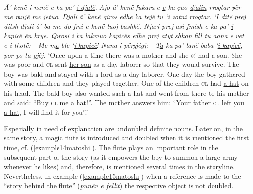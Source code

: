 \documentclass[output=paper]{langsci/langscibook}
\begin{document}
\ea \label{example13matoshi}
	\\
	\textit{Â’ kenë i nanë e ka pa’ \uline{i djalë}. Ajo â’ kenë fukara e \uline{e} ka çuo \uline{djalin} rrogtar për me mujë me jetuo. Djali â’ kenë qiros edhe ka tejë tu ‘i zotni rrogtar. ‘I ditë prej ditsh djali â’ ba me do fmi e kanë luoj bashkë. Njari prej asi fmísh e ka pa’ \uline{i kapicë} ën krye. Qirosi i ka lakmuo kapicës edhe prej atyt shkon fill tu nana e vet e i thotë: - Me m\uline{a} ble ‘\uline{i kapicë}! Nana i përgjégj: - T\uline{a} ka pa’ lanë baba ‘\uline{i kapicë}, por po ta gjêj.}
	\glt ‘Once upon a time there was a mother and she $\varnothing$ had \uline{a son}. She was poor and \textsc{cl} sent \uline{her son} as a day laborer so that they would survive. The boy was bald and stayed with a lord as a day laborer. One day the boy gathered with some children and they played together. One of the children \textsc{cl} had \uline{a hat} on his head. The bald boy also wanted such a hat and went from there to his mother and said: \enquote{Buy \textsc{cl} me \uline{a hat}!}. The mother answers him: \enquote{Your father \textsc{cl} left you \uline{a hat}, I will find it for you}.’
\z

Especially in need of explanation are undoubled definite nouns. Later on, in the same story, a magic flute is introduced and doubled when it is mentioned the first time, cf. (\ref{example14matoshi}). The flute plays an important role in the subsequent part of the story (as it empowers the boy to summon a large army whenever he likes) and, therefore, is mentioned several times in the storyline. Nevertheless, in example (\ref{example15matoshi}) when a reference is made to the \enquote{story behind the flute} (\textit{punën e fellit}) the respective object is not doubled.\largerpage
\end{document}
